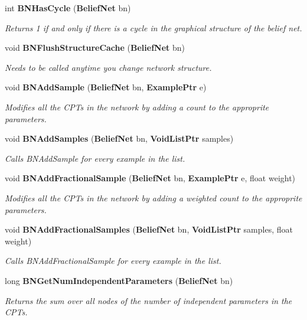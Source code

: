 \begin{CompactItemize}
int {\bf BNHas\-Cycle} ({\bf Belief\-Net} bn)
\begin{CompactList}\small\item\em Returns 1 if and only if there is a cycle in the graphical structure of the belief net. \item\end{CompactList}\item 
void {\bf BNFlush\-Structure\-Cache} ({\bf Belief\-Net} bn)
\begin{CompactList}\small\item\em Needs to be called anytime you change network structure. \item\end{CompactList}\item 
void {\bf BNAdd\-Sample} ({\bf Belief\-Net} bn, {\bf Example\-Ptr} e)
\begin{CompactList}\small\item\em Modifies all the CPTs in the network by adding a count to the approprite parameters. \item\end{CompactList}\item 
void {\bf BNAdd\-Samples} ({\bf Belief\-Net} bn, {\bf Void\-List\-Ptr} samples)
\begin{CompactList}\small\item\em Calls BNAdd\-Sample for every example in the list. \item\end{CompactList}\item 
void {\bf BNAdd\-Fractional\-Sample} ({\bf Belief\-Net} bn, {\bf Example\-Ptr} e, float weight)
\begin{CompactList}\small\item\em Modifies all the CPTs in the network by adding a weighted count to the approprite parameters. \item\end{CompactList}\item 
void {\bf BNAdd\-Fractional\-Samples} ({\bf Belief\-Net} bn, {\bf Void\-List\-Ptr} samples, float weight)
\begin{CompactList}\small\item\em Calls BNAdd\-Fractional\-Sample for every example in the list. \item\end{CompactList}\item 
long {\bf BNGet\-Num\-Independent\-Parameters} ({\bf Belief\-Net} bn)
\begin{CompactList}\small\item\em Returns the sum over all nodes of the number of independent parameters in the CPTs. \item\end{CompactList}\item 

\end{CompactItemize}
